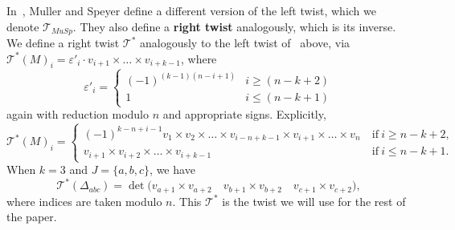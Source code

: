\documentclass[11pt]{article}
\theoremstyle{definition}
\numberwithin{equation}{section}
\def\lT {{\mathscr{T}}}
\def\T {{\mathscr{T}^*}}
\numberwithin{equation}{section}
\begin{document}
In~\cite{mullerspeyer}, Muller and Speyer define a different version of the left twist, which we denote $\lT_{MuSp}$. They also define a \textbf{right twist} analogously, which is its inverse. We define a right twist $\T$ analogously to the left twist of~\cite{marshscott2016} above, via $\T(M)_i= \varepsilon'_i \cdot v_{i+1} \times \dots \times v_{i+k-1}$, where
\[\varepsilon'_i = \begin{cases}
(-1)^{(k-1)(n-i+1)} & i \geq (n-k+2)\\
1 & i \leq (n-k+1)
\end{cases}\]
again with reduction modulo $n$ and appropriate signs. Explicitly,
{\small $$\T(M)_i = \begin{cases} 
(-1)^{k-n+i-1} v_1 \times v_2 \times \dots \times v_{i-n+k-1} \times v_{i+1} \times \dots \times v_n & \mathrm{~if~} i\geq n-k+2, \\
v_{i+1} \times v_{i+2} \times \dots \times v_{i+k-1} & \mathrm{~if~} i\leq n-k+1. \end{cases}$$}
When $k=3$ and $J=\{a,b,c\}$, we have
$$\T(\Delta_{abc}) = \det \bigg(v_{a+1} \times v_{a+2} \quad v_{b+1} \times v_{b+2} \quad 
v_{c+1} \times v_{c+2}\bigg),$$ 
where indices are taken modulo $n$.
This $\T$ is the twist we will use for the rest of the paper.
\end{document}
